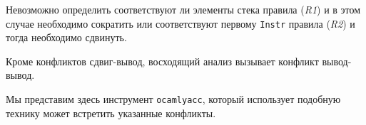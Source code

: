 Невозможно определить соответствуют ли элементы стека правила ({\it R1}) и в
этом случае необходимо сократить или соответствуют первому \texttt{Instr}
правила ({\it R2}) и тогда необходимо сдвинуть.

Кроме конфликтов сдвиг-вывод, восходящий анализ вызывает конфликт вывод-вывод.

Мы представим здесь инструмент \texttt{ocamlyacc}, который использует подобную
технику может встретить указанные конфликты.